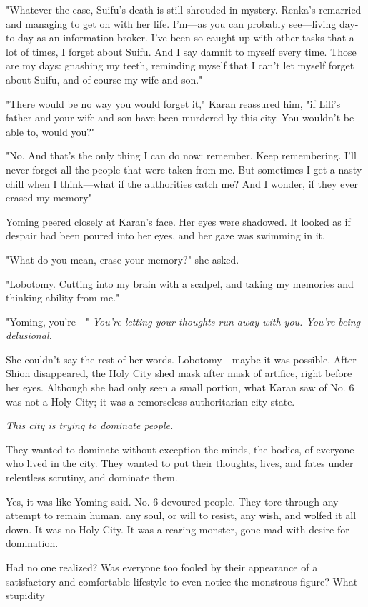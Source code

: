 "Whatever the case, Suifu's death is still shrouded in mystery. Renka's
remarried and managing to get on with her life. I'm---as you can probably
see---living day-to-day as an information-broker. I've been so caught up
with other tasks that a lot of times, I forget about Suifu. And I say
damnit to myself every time. Those are my days: gnashing my teeth,
reminding myself that I can't let myself forget about Suifu, and of
course my wife and son."

"There would be no way you would forget it," Karan reassured him, "if
Lili's father and your wife and son have been murdered by this city. You
wouldn't be able to, would you?"

"No. And that's the only thing I can do now: remember. Keep remembering.
I'll never forget all the people that were taken from me. But sometimes
I get a nasty chill when I think---what if the authorities catch me? And I
wonder, if they ever erased my memory\el "

Yoming peered closely at Karan's face. Her eyes were shadowed. It looked
as if despair had been poured into her eyes, and her gaze was swimming
in it.

"What do you mean, erase your memory?" she asked.

"Lobotomy. Cutting into my brain with a scalpel, and taking my memories
and thinking ability from me."

"Yoming, you're---" \emph{You're letting your thoughts run away with you. You're
being delusional.}

She couldn't say the rest of her words. Lobotomy---maybe it was possible.
After Shion disappeared, the Holy City shed mask after mask of artifice,
right before her eyes. Although she had only seen a small portion, what
Karan saw of No. 6 was not a Holy City; it was a remorseless
authoritarian city-state.

\emph{This city is trying to dominate people.}

They wanted to dominate without exception the minds, the bodies, of
everyone who lived in the city. They wanted to put their thoughts,
lives, and fates under relentless scrutiny, and dominate them.

Yes, it was like Yoming said. No. 6 devoured people. They tore through
any attempt to remain human, any soul, or will to resist, any wish, and
wolfed it all down. It was no Holy City. It was a rearing monster, gone
mad with desire for domination.

Had no one realized? Was everyone too fooled by their appearance of a
satisfactory and comfortable lifestyle to even notice the monstrous
figure? What stupidity\el 

